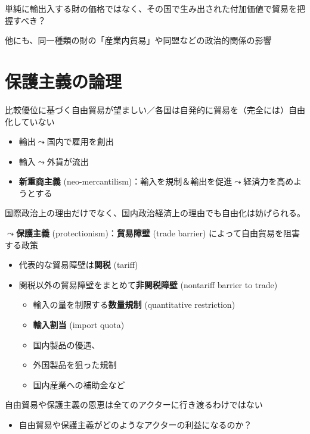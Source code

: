 \documentclass[
  xelatex,
  ja=standard]{bxjsarticle}
\providecommand{\tightlist}{%
  \setlength{\itemsep}{0pt}\setlength{\parskip}{0pt}}\usepackage{longtable,booktabs,array}
\begin{document}
単純に輸出入する財の価格ではなく、その国で生み出された付加価値で貿易を把握すべき？\citep{inomata2019}

他にも、同一種類の財の「産業内貿易」や同盟などの政治的関係の影響

\hypertarget{ux4fddux8b77ux4e3bux7fa9ux306eux8ad6ux7406}{%
\section{保護主義の論理}\label{ux4fddux8b77ux4e3bux7fa9ux306eux8ad6ux7406}}

比較優位に基づく自由貿易が望ましい／各国は自発的に貿易を（完全には）自由化していない

\begin{itemize}
\tightlist
\item
  輸出\(\leadsto\)国内で雇用を創出
\item
  輸入\(\leadsto\)外貨が流出
\item
  \textbf{新重商主義}
  (neo-mercantilism)：輸入を規制＆輸出を促進\(\leadsto\)経済力を高めようとする
\end{itemize}

国際政治上の理由だけでなく、国内政治経済上の理由でも自由化は妨げられる。

\(\leadsto\)\textbf{保護主義} (protectionism)：\textbf{貿易障壁} (trade
barrier) によって自由貿易を阻害する政策

\begin{itemize}
\tightlist
\item
  代表的な貿易障壁は\textbf{関税} (tariff)
\item
  関税以外の貿易障壁をまとめて\textbf{非関税障壁} (nontariff barrier to
  trade)

  \begin{itemize}
  \tightlist
  \item
    輸入の量を制限する\textbf{数量規制} (quantitative restriction)
  \item
    \textbf{輸入割当} (import quota)
  \item
    国内製品の優遇、
  \item
    外国製品を狙った規制
  \item
    国内産業への補助金など
  \end{itemize}
\end{itemize}

自由貿易や保護主義の恩恵は全てのアクターに行き渡るわけではない

\begin{itemize}
\tightlist
\item
  自由貿易や保護主義がどのようなアクターの利益になるのか？
\end{itemize}
\end{document}
